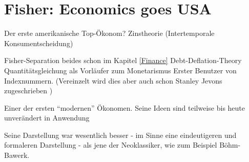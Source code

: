 \section{Fisher: Economics goes USA}
Der erste amerikanische Top-Ökonom?
Zinstheorie (Intertemporale Konsumentscheidung)

Fisher-Separation
beides schon im Kapitel \ref{Finance}
Debt-Deflation-Theory
Quantitätsgleichung als Vorläufer zum Monetarismus
Erster Benutzer von Indexnummern. (Vereinzelt wird dies aber auch schon Stanley Jevons zugeschrieben \parencite[S. 232]{Jevons1934})

Einer der ersten "`modernen"' Ökonomen. Seine Ideen sind teilweise bis heute unverändert in Anwendung

Seine Darstellung war wesentlich besser - im Sinne eine eindeutigeren und formaleren Darstellung - als jene der Neoklassiker, wie zum Beispiel Böhm-Bawerk.


\textcite{Tobin2005}